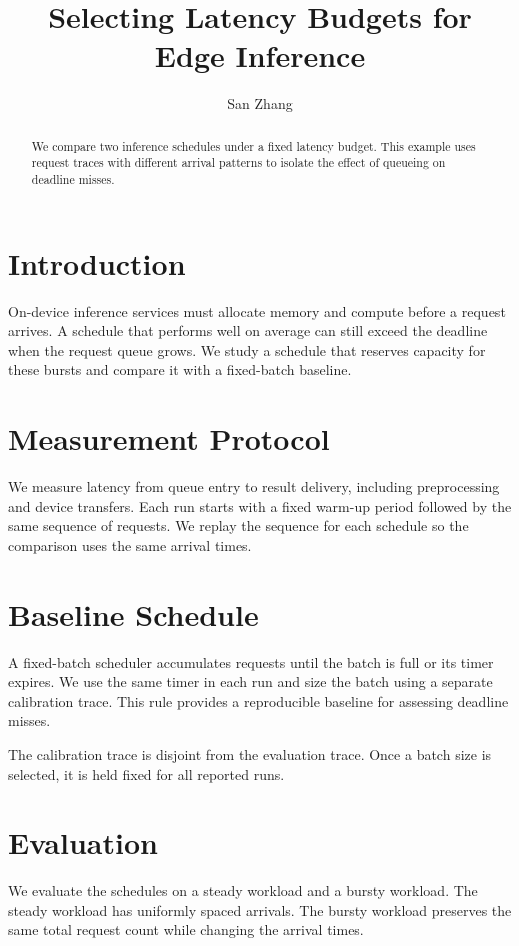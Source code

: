 \documentclass[sigconf,nonacm]{acmart}
\title{Selecting Latency Budgets for Edge Inference}
\author{San Zhang}
\affiliation{%
  \institution{University of Technology}
  \city{Example City}
  \country{China}%
}
\begin{document}
\begin{abstract}
We compare two inference schedules under a fixed latency budget. This example
uses request traces with different arrival patterns to isolate the effect of
queueing on deadline misses.
\end{abstract}
\maketitle

\section{Introduction}
On-device inference services must allocate memory and compute before a request
arrives. A schedule that performs well on average can still exceed the deadline
when the request queue grows. We study a schedule that reserves capacity for
these bursts and compare it with a fixed-batch baseline.

\section{Measurement Protocol}
\rpoint[E3]We measure latency from queue entry to result delivery, including
preprocessing and device transfers. Each run starts with a fixed warm-up period
followed by the same sequence of requests. We replay the sequence for each
schedule so the comparison uses the same arrival times.

\newpage
\section{Baseline Schedule}
A fixed-batch scheduler accumulates requests until the batch is full or its
timer expires. We use the same timer in each run and size the batch using a
separate calibration trace. This rule provides a reproducible baseline for
assessing deadline misses.

\rpoint[E4]The calibration trace is disjoint from the evaluation trace. Once a
batch size is selected, it is held fixed for all reported runs.

\clearpage
\section{Evaluation}
We evaluate the schedules on a steady workload and a bursty workload. The
steady workload has uniformly spaced arrivals. The bursty workload preserves
the same total request count while changing the arrival times.
\end{document}
